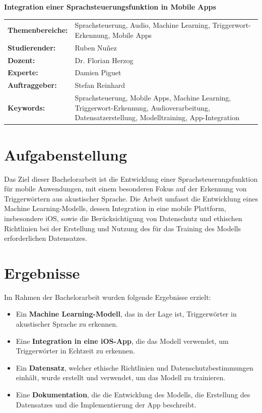 \documentclass[11pt,a4paper]{article}
\newcommand{\titleformat}{\fontsize{18pt}{22pt}\selectfont}
\newcommand{\bodytextformat}{\fontsize{10pt}{12pt}\selectfont}
\begin{document}
\begin{flushleft}
    {\titleformat\textbf{Integration einer Sprachsteuerungsfunktion in Mobile Apps}}\\[0.5cm]
  \end{flushleft}

\bodytextformat

\noindent
\begin{tabularx}{\linewidth}{@{}p{4cm}X@{}}
    \textbf{Themenbereiche:} & Sprachsteuerung, Audio, Machine Learning, Triggerwort-Erkennung, Mobile Apps \\
    \textbf{Studierender:} & Ruben Nuñez \\
    \textbf{Dozent:} & Dr. Florian Herzog \\
    \textbf{Experte:} & Damien Piguet \\
    \textbf{Auftraggeber:} & Stefan Reinhard \\
    \textbf{Keywords:} & Sprachsteuerung, Mobile Apps, Machine Learning, Triggerwort-Erkennung, Audioverarbeitung, Datensatzerstellung, Modelltraining, App-Integration \\
\end{tabularx}
    




\section{Aufgabenstellung}
Das Ziel dieser Bachelorarbeit ist die Entwicklung einer Sprachsteuerungsfunktion für mobile Anwendungen, mit einem besonderen Fokus auf der Erkennung von Triggerwörtern aus akustischer Sprache. Die Arbeit umfasst die Entwicklung eines Machine Learning-Modells, dessen Integration in eine mobile Plattform, insbesondere iOS, sowie die Berücksichtigung von Datenschutz und ethischen Richtlinien bei der Erstellung und Nutzung des für das Training des Modells erforderlichen Datensatzes.


\section{Ergebnisse}
Im Rahmen der Bachelorarbeit wurden folgende Ergebnisse erzielt:

\begin{itemize}
    \itemsep0em
    \item Ein \textbf{Machine Learning-Modell}, das in der Lage ist, Triggerwörter in akustischer Sprache zu erkennen.
    \item Eine \textbf{Integration in eine iOS-App}, die das Modell verwendet, um Triggerwörter in Echtzeit zu erkennen.
    \item Ein \textbf{Datensatz}, welcher ethische Richtlinien und Datenschutzbestimmungen einhält, wurde erstellt und verwendet, um das Modell zu trainieren.
    \item Eine \textbf{Dokumentation}, die die Entwicklung des Modells, die Erstellung des Datensatzes und die Implementierung der App beschreibt.
\end{itemize}
\end{document}
